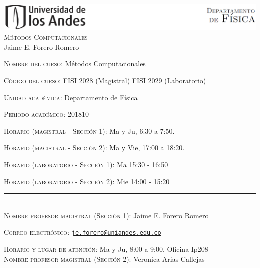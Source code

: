 \documentclass[letterpaper,10pt,onecolumn]{article}
\begin{document}
\begin{center}

\includegraphics[width=490pt]{header.png}\\[0.5cm]

\textsc{\LARGE M\'etodos Computacionales}\\[0.1cm]
\large Jaime E. Forero Romero\\[0.5cm]

\end{center}

\large \noindent\textsc{Nombre del curso:}  M\'etodos Computacionales%
  
\noindent\textsc{C\'odigo del curso:} FISI 2028 (Magistral) FISI 2029 (Laboratorio) %

\noindent\textsc{Unidad acad\'emica:} Departamento de F\'isica

\noindent\textsc{Periodo acad\'emico:} 201810 %

\noindent\textsc{Horario (magistral - Secci\'on 1):} Ma y Ju, 6:30 a 7:50.

\noindent\textsc{Horario (magistral - Secci\'on 2):} Ma y Vie, 17:00 a 18:20.

\noindent\textsc{Horario (laboratorio - Secci\'on 1):} Ma 15:30 - 16:50

\noindent\textsc{Horario (laboratorio - Secci\'on 2):} Mie 14:00 - 15:20

\noindent\rule{\textwidth}{1pt}\\[-0.3cm]

\normalsize \noindent\textsc{Nombre profesor magistral (Secci\'on 1):} Jaime
E. Forero Romero%

\noindent\textsc{Correo electr\'onico:}
\href{mailto:je.forero@uniandes.edu.co}{\nolinkurl{je.forero@uniandes.edu.co}}

\noindent\textsc{Horario y lugar de atenci\'on:} Ma y Ju, 8:00 a 9:00, Oficina Ip208 
\\[-0.1cm]

\normalsize \noindent\textsc{Nombre profesor magistral (Secci\'on 2):}
Veronica Arias Callejas %
\end{document}
